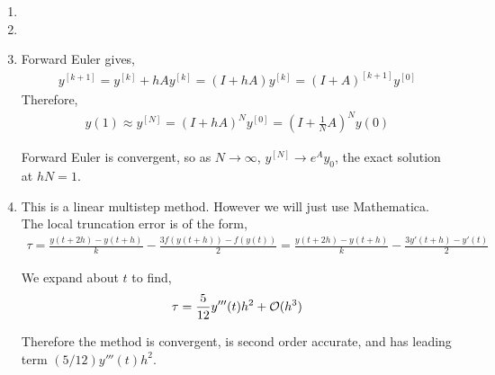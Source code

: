 \documentclass[10pt]{article}
\begin{document}
\begin{solution}[Solution]
\begin{enumerate}[label=(\alph*)]
    \item 
        
    \item 
    \item Forward Euler gives,
        \begin{align*}
            y^{[k+1]} = y^{[k]} + h A y^{[k]} = (I + hA)y^{[k]} = (I+A)^{[k+1]} y^{[0]}
        \end{align*}
        Therefore,
        \begin{align*}
            y(1) \approx y^{[N]} = (I+h A)^N y^{[0]} = \left(I+\frac{1}{N}A\right)^N y(0)
        \end{align*}
        
        Forward Euler is convergent, so as \( N\to\infty \), \( y^{[N]} \to e^A y_0 \), the exact solution at \( hN=1 \).

    \item This is a linear multistep method. However we will just use Mathematica. The local truncation error is of the form,
        \begin{align*}
            \tau 
            = \frac{y(t+2h)-y(t+h)}{k} - \frac{3f(y(t+h))-f(y(t))}{2}
            = \frac{y(t+2h)-y(t+h)}{k} - \frac{3y'(t+h)-y'(t)}{2}
        \end{align*}

        We expand about \( t \) to find,
        \begin{align*}
            \tau = \frac{5}{12} y'''(t) h^2 + \mathcal{O}(h^3) 
        \end{align*}
        
        Therefore the method is convergent, is second order accurate, and has leading term \( (5/12)y'''(t) h^2 \).       

\end{enumerate}
\end{solution}
\end{document}
